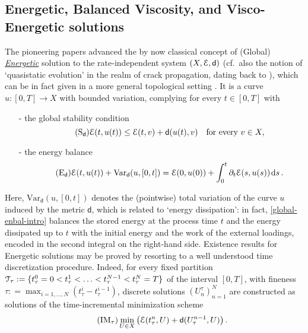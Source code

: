 \documentclass[a4paper,10pt,reqno]{amsart} %
\numberwithin{equation}{section}
\def\dd{\;\!\mathrm{d}} %
\newcommand{\Xs}{X}
\newcommand{\mdn}{\mathsf{d}}
\newcommand{\md}[2]{\mathsf{d}(#1,#2)}
\newcommand{\ene}[2]{\mathcal{E}(#1,#2)}
\newcommand{\pw}[2]{\mathcal{P}(#1,#2)}
\newcommand{\ds}[3]{{#1}_{#2}^{#3}}
\newcommand{\Vari}[4]{\mathrm{Var}_{#1}(#2,[#3,#4])}
\newcommand{\RIS}{(\Xs,\calE,\mdn)}
\begin{document}
\subsection{Energetic, Balanced Viscosity, and Visco-Energetic solutions}
The pioneering papers \cite{MieThe99MMRI,MieThe04RIHM}  advanced the by now classical concept of (Global) \underline{\emph{Energetic}} solution to the rate-independent system $\RIS$ (cf.\ also  the notion of `quasistatic
evolution' in the realm of crack propagation, dating back to \cite{DM-Toa2002}), which can be in fact given in a more general topological setting \cite{MaiMie05EREM}. 
 It is a curve $u: [0,T]\to \Xs$ with bounded variation, complying
 for every $t\in [0,T]$  with 
 \begin{itemize}
 	\item[-] the global stability condition
 	\begin{equation}
 	\label{global-stab-intro}
 	\tag{$\mathrm{S}_{\mdn}$}
 	\ene t{u(t)} \leq \ene tv + \md{u(t)}{v} \quad \text{for every } v \in \Xs,
 	\end{equation}
 	\item[-]  the energy balance
 	\begin{equation}
 	\label{global-enbal-intro}
 	\tag{$\mathrm{E}_{\mdn}$}
 	\ene t{u(t)} + \Vari {\mdn}{u}0{t} = \ene 0{u(0)} +\int_0^t \partial_t \ene s{u(s)} \dd s \,.
 	\end{equation}
 \end{itemize}
Here, $ \Vari {\mdn}{u}0{t} $ denotes the (pointwise) total
variation of the curve $u$ induced by the metric $\mdn$, which is related to `energy dissipation': in fact, 
\eqref{global-enbal-intro}  balances the stored energy at the process time $t$ and the energy dissipated up to   $t$
with the initial energy and the work of the external loadings, encoded in the second integral on the right-hand side. 
 Existence results for Energetic solutions may be proved by resorting to a well understood time discretization procedure. Indeed, for every fixed partition $\calT_\tau: = \{ \ds t \tau 0=0< 
\ds t  \tau1 <\ldots<\ds t \tau{N-1}<\ds t \tau N=T\}$ of the interval 
$[0,T]$, with fineness $\tau: = \max_{i=1,\ldots,N} (\ds t \tau i {-} \ds t \tau{i-1})$, 
discrete solutions $(\ds Un\tau)_{n=1}^{N}$  are constructed as solutions of the time-incremental minimization scheme  
\begin{equation}
\label{tims-ris}
\tag{$\mathrm{IM}_\tau$}
\min_{U\in \Xs} \left( \ene{\ds t  \tau n}{U}+ \md{\ds U\tau{n-1}}{U} \right).
\end{equation}
\end{document}
